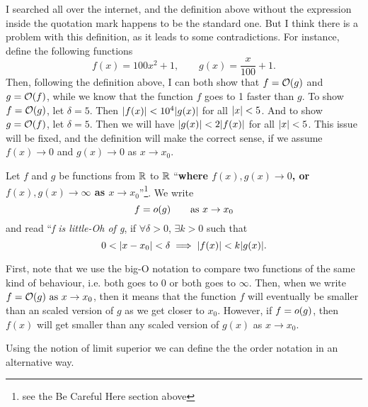 \begin{beCareful}
	I searched all over the internet, and the definition above without the expression inside the quotation mark happens to be the standard one. But I think there is a problem with this definition, as it leads to some contradictions. For instance, define the following functions
	\[ f(x) = 100x^2 + 1, \qquad g(x) = \frac{x}{100} + 1.\]
	Then, following the definition above, I can both show that $ f = \mathcal{O}(g) $ and $ g = \mathcal{O}(f) $, while we know that the function $ f $ goes to 1 faster than $ g $. To show $ f = \mathcal{O}(g) $, let $ \delta = 5 $. Then $ |f(x)| < 10^4 |g(x)| $ for all $ |x| < 5 $. And to show $ g = \mathcal{O}(f) $, let $ \delta = 5 $. Then we will have $ |g(x)| < 2 |f(x)| $ for all $ |x| < 5 $. This issue will be fixed, and the definition will make the correct sense, if we assume $ f(x) \to 0$ and $ g(x)\to 0 $ as $ x \to x_0 $.
\end{beCareful}

\begin{definition}
	Let $ f $ and $ g $ be functions from $ \mathbb{R} $ to $ \mathbb{R} $ ``\textbf{where $ f(x), g(x)\to 0 $, or $ f(x),g(x) \to \infty $ as $ x \to x_0 $}''\footnote{see the Be Careful Here section above}. We write
	\[ f = o(g) \qquad \text{as}\ x \to x_0 \]
	and read ``\emph{f is little-Oh of g}, if $ \forall \delta > 0 $, $ \exists k >0 $ such that
	\[ 0< |x - x_0| < \delta \implies |f(x)| < k |g(x)|. \] 
\end{definition}


\begin{observation}
	First, note that we use the big-O notation to compare two functions of the same kind of behaviour, i.e. both goes to 0 or both goes to $ \infty $. Then, when we write $ f = \O(g)\ \text{as}\ x\to x_0$, then it means that the function $ f $ will eventually be smaller than an scaled version of $ g $ as we get closer to $ x_0 $. However, if $ f = o(g) $, then $ f(x) $ will get smaller than any scaled version of $ g(x) $ as $ x \to x_0 $.
\end{observation}

Using the notion of limit superior we can define the the order notation in an alternative way.


